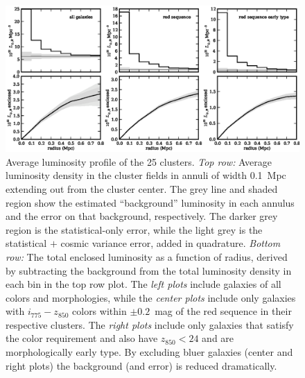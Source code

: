 
\begin{figure}[tb]
\includegraphics[width=\textwidth]{figures/clrate/avgprofile_mult.eps}
\caption[Average luminosity profile of the 25 clusters.]
{Average luminosity profile of the 25 clusters. {\it Top row:}  
Average luminosity density in the cluster fields in annuli of width
0.1~Mpc extending out from the cluster center. The grey line and
shaded region show the estimated ``background'' luminosity in each
annulus and the error on that background, respectively. The darker
grey region is the statistical-only error, while the light grey is the
statistical $+$ cosmic variance error, added in quadrature. {\it
Bottom row:} The total enclosed luminosity as a function of radius,
derived by subtracting the background from the total luminosity
density in each bin in the top row plot. The \emph{left plots} include
galaxies of all colors and morphologies, while the \emph{center plots}
include only galaxies with $i_{775}-z_{850}$ colors within $\pm
0.2$~mag of the red sequence in their respective clusters. The \emph{right
plots} include only galaxies that satisfy the color requirement and
also have $z_{850} < 24$ and are morphologically early type. By
excluding bluer galaxies (center and right plots) the background (and
error) is reduced dramatically.\label{fig:avgprofile_mult}}
\end{figure}

